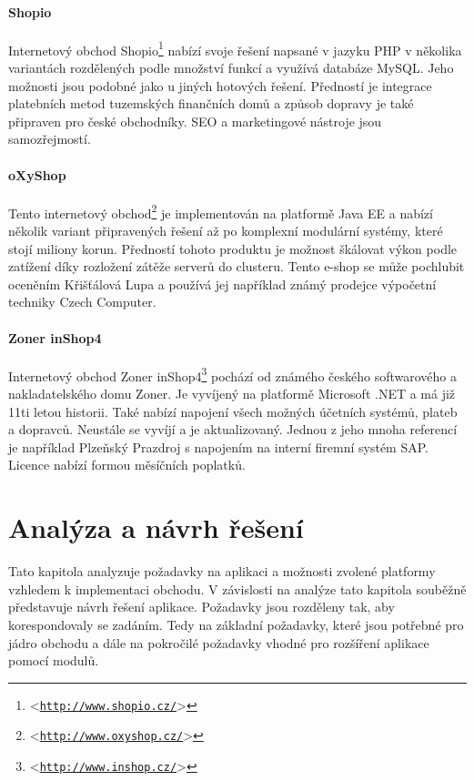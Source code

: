 \documentclass[11pt,twoside,a4paper]{book}
\let\oldUrl\url
\renewcommand\url[1]{<\texttt{\oldUrl{#1}}>}
\begin{document}
\subsubsection{Shopio}
Internetový obchod Shopio\footnote{\url{http://www.shopio.cz/}} nabízí svoje řešení napsané v jazyku PHP v několika variantách rozdělených podle množství funkcí a využívá databáze MySQL. Jeho možnosti jsou podobné jako u jiných hotových řešení. Předností je integrace platebních metod tuzemských finančních domů a způsob dopravy je také připraven pro české obchodníky. SEO a marketingové nástroje jsou samozřejmostí.

\subsubsection{oXyShop}
Tento internetový obchod\footnote{\url{http://www.oxyshop.cz/}} je implementován na platformě Java EE a nabízí několik variant připravených řešení až po komplexní modulární systémy, které stojí miliony korun. Předností tohoto produktu je možnost škálovat výkon podle zatížení díky rozložení zátěže serverů do clusteru. Tento e-shop se může pochlubit oceněním Křišťálová Lupa a používá jej například známý prodejce výpočetní techniky Czech Computer.

\subsubsection{Zoner inShop4} 
Internetový obchod Zoner inShop4\footnote{\url{http://www.inshop.cz/}} pochází od známého českého softwarového a nakladatelského domu Zoner. Je vyvíjený na platformě Microsoft .NET a má již 11ti letou historii. Také nabízí napojení všech možných účetních systémů, plateb a dopravců. Neustále se vyvíjí a je aktualizovaný. Jednou z jeho mnoha referencí je například Plzeňský Prazdroj s napojením na interní firemní systém SAP. Licence nabízí formou měsíčních poplatků.




\chapter{Analýza a návrh řešení}
\label{sec:analyza}


Tato kapitola analyzuje požadavky na aplikaci a možnosti zvolené platformy vzhledem k implementaci obchodu. V závislosti na analýze tato kapitola souběžně představuje návrh řešení aplikace. Požadavky jsou rozděleny tak, aby korespondovaly se zadáním. Tedy na základní požadavky, které jsou potřebné pro jádro obchodu a dále na pokročilé požadavky vhodné pro rozšíření aplikace pomocí modulů.
\end{document}
